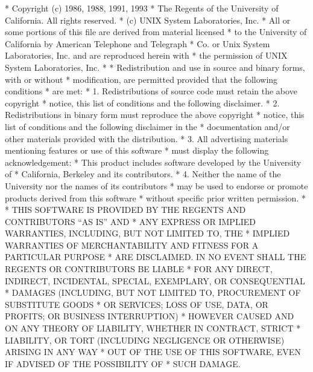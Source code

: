 \begin{copyrightEnv}
 * Copyright (c) 1986, 1988, 1991, 1993
 *	The Regents of the University of California.  All rights reserved.
 * (c) UNIX System Laboratories, Inc.
 * All or some portions of this file are derived from material licensed
 * to the University of California by American Telephone and Telegraph
 * Co. or Unix System Laboratories, Inc. and are reproduced herein with
 * the permission of UNIX System Laboratories, Inc.
 *
 * Redistribution and use in source and binary forms, with or without
 * modification, are permitted provided that the following conditions
 * are met:
 * 1. Redistributions of source code must retain the above copyright
 *    notice, this list of conditions and the following disclaimer.
 * 2. Redistributions in binary form must reproduce the above copyright
 *    notice, this list of conditions and the following disclaimer in the
 *    documentation and/or other materials provided with the distribution.
 * 3. All advertising materials mentioning features or use of this software
 *    must display the following acknowledgement:
 *	This product includes software developed by the University of
 *	California, Berkeley and its contributors.
 * 4. Neither the name of the University nor the names of its contributors
 *    may be used to endorse or promote products derived from this software
 *    without specific prior written permission.
 *
 * THIS SOFTWARE IS PROVIDED BY THE REGENTS AND CONTRIBUTORS ``AS IS'' AND
 * ANY EXPRESS OR IMPLIED WARRANTIES, INCLUDING, BUT NOT LIMITED TO, THE
 * IMPLIED WARRANTIES OF MERCHANTABILITY AND FITNESS FOR A PARTICULAR PURPOSE
 * ARE DISCLAIMED.  IN NO EVENT SHALL THE REGENTS OR CONTRIBUTORS BE LIABLE
 * FOR ANY DIRECT, INDIRECT, INCIDENTAL, SPECIAL, EXEMPLARY, OR CONSEQUENTIAL
 * DAMAGES (INCLUDING, BUT NOT LIMITED TO, PROCUREMENT OF SUBSTITUTE GOODS
 * OR SERVICES; LOSS OF USE, DATA, OR PROFITS; OR BUSINESS INTERRUPTION)
 * HOWEVER CAUSED AND ON ANY THEORY OF LIABILITY, WHETHER IN CONTRACT, STRICT
 * LIABILITY, OR TORT (INCLUDING NEGLIGENCE OR OTHERWISE) ARISING IN ANY WAY
 * OUT OF THE USE OF THIS SOFTWARE, EVEN IF ADVISED OF THE POSSIBILITY OF
 * SUCH DAMAGE.
\end{copyrightEnv}

